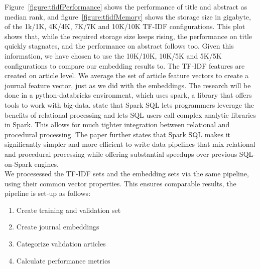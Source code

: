 \documentclass[../../Thesis.tex]{subfiles}
\begin{document}
\FloatBarrier
Figure~\ref{figure:tfidfPerformance} shows the performance of title and abstract as median rank, and figure~\ref{figure:tfidfMemory} shows the storage size in gigabyte, of the 1k/1K, 4K/4K, 7K/7K and 10K/10K TF-IDF configurations. This plot shows that, while the required storage size keeps rising, the performance on title quickly stagnates, and the performance on abstract follows too. Given this information, we have chosen to use the 10K/10K, 10K/5K and 5K/5K configurations to compare our embedding results to. The TF-IDF features are created on article level. We average the set of article feature vectors to create a journal feature vector, just as we did with the embeddings. 
The research will be done in a python-databricks environment, which uses spark, a library that offers tools to work with big-data. \citet{armbrust2015spark} state that Spark SQL lets programmers leverage the benefits of relational processing and lets SQL users call complex analytic libraries in Spark. This allows for much tighter integration between relational and procedural processing. The paper further states that Spark SQL makes it significantly simpler and more efficient to write data pipelines that mix relational and procedural processing while offering substantial speedups over previous SQL-on-Spark engines.\\
We procesessed the TF-IDF sets and the embedding sets via the same pipeline, using their common vector properties. This ensures comparable results, the pipeline is set-up as follows:
\begin{enumerate}
\item{Create training and validation set}
\item{Create journal embeddings}
\item{Categorize validation articles}
\item{Calculate performance metrics}
\end{enumerate}
  
\end{document}
